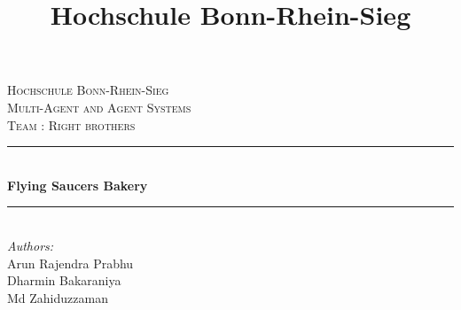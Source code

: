 \documentclass[12pt]{article}
\title{Hochschule Bonn-Rhein-Sieg}
\begin{document}
\begin{titlepage}

\newcommand{\HRule}{\rule{\linewidth}{0.5mm}} %

\begin{center}
\textsc{\LARGE Hochschule Bonn-Rhein-Sieg}\\[1.5cm] %
\textsc{\Large Multi-Agent and Agent Systems}\\[0.5cm] %
\textsc{\large Team : Right brothers}\\[0.5cm] %

\HRule \\[0.4cm]
{ \huge \bfseries Flying Saucers Bakery}\\[0.4cm] %
\HRule \\[1.5cm]
 

\large\emph{Authors:}\\ Arun Rajendra Prabhu\\ Dharmin Bakaraniya\\ Md Zahiduzzaman\\[1.0cm]%




\end{center}
\end{titlepage}
\end{document}
